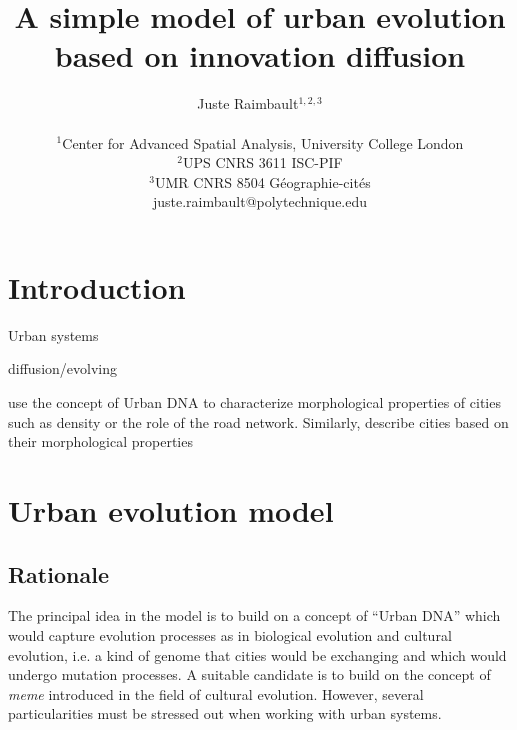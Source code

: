 \documentclass[letterpaper]{article}
\title{A simple model of urban evolution based on innovation diffusion}
\author{Juste Raimbault$^{1,2,3}$\\
\mbox{}\\
$^1$Center for Advanced Spatial Analysis, University College London\\
$^2$UPS CNRS 3611 ISC-PIF\\
$^3$UMR CNRS 8504 G{\'e}ographie-cit{\'e}s\\
juste.raimbault@polytechnique.edu} %
\begin{document}
\maketitle

\begin{abstract}
  
\end{abstract}


\section{Introduction}



Urban systems 
\cite{batty2009centenary}








\cite{Eletreby5664} diffusion/evolving


\cite{votsis2019urban} use the concept of Urban DNA to characterize morphological properties of cities such as density or the role of the road network. Similarly, \cite{kaya2017urban} describe cities based on their morphological properties


\cite{wu2011urban}










\section{Urban evolution model}

\subsection{Rationale}

The principal idea in the model is to build on a concept of ``Urban DNA'' which would capture evolution processes as in biological evolution and cultural evolution, i.e. a kind of genome that cities would be exchanging and which would undergo mutation processes. A suitable candidate is to build on the concept of \emph{meme} introduced in the field of cultural evolution. However, several particularities must be stressed out when working with urban systems.
\end{document}
